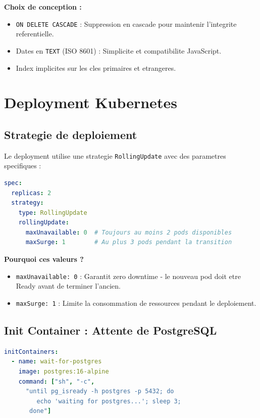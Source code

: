 \documentclass[12pt,a4paper,french]{report}
\begin{document}
\textbf{Choix de conception :}
\begin{itemize}
    \item \texttt{ON DELETE CASCADE} : Suppression en cascade pour maintenir l'integrite referentielle.
    \item Dates en \texttt{TEXT} (ISO 8601) : Simplicite et compatibilite JavaScript.
    \item Index implicites sur les cles primaires et etrangeres.
\end{itemize}

\section{Deployment Kubernetes}

\subsection{Strategie de deploiement}

Le deployment utilise une strategie \texttt{RollingUpdate} avec des parametres specifiques :

\begin{lstlisting}[language=yaml, caption=Strategie RollingUpdate]
spec:
  replicas: 2
  strategy:
    type: RollingUpdate
    rollingUpdate:
      maxUnavailable: 0  # Toujours au moins 2 pods disponibles
      maxSurge: 1        # Au plus 3 pods pendant la transition
\end{lstlisting}

\textbf{Pourquoi ces valeurs ?}
\begin{itemize}
    \item \texttt{maxUnavailable: 0} : Garantit zero downtime - le nouveau pod doit etre Ready avant de terminer l'ancien.
    \item \texttt{maxSurge: 1} : Limite la consommation de ressources pendant le deploiement.
\end{itemize}

\subsection{Init Container : Attente de PostgreSQL}

\begin{lstlisting}[language=yaml, caption=Init container pour dependance]
initContainers:
  - name: wait-for-postgres
    image: postgres:16-alpine
    command: ["sh", "-c",
      "until pg_isready -h postgres -p 5432; do
         echo 'waiting for postgres...'; sleep 3;
       done"]
\end{lstlisting}
\end{document}
